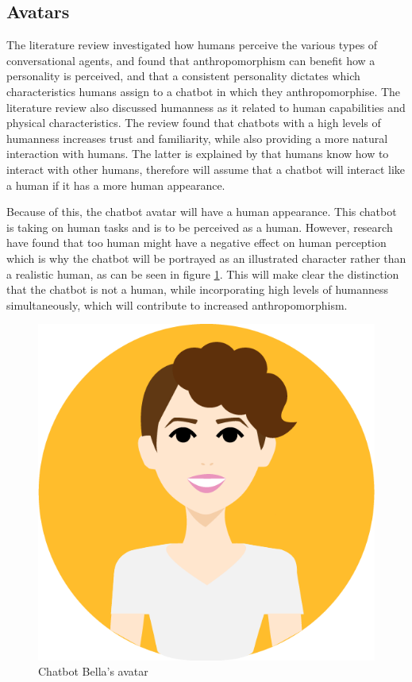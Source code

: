         
\vspace{5mm}

    \subsection{Avatars}
    The literature review investigated how humans perceive the various types of conversational agents, and found that anthropomorphism can benefit how a personality is perceived, and that a consistent personality dictates which characteristics humans assign to a chatbot in which they anthropomorphise. The literature review also discussed humanness as it related to human capabilities and physical characteristics. The review found that chatbots with a high levels of humanness increases trust and familiarity, while also providing a more natural interaction with humans. The latter is explained by that humans know how to interact with other humans, therefore will assume that a chatbot will interact like a human if it has a more human appearance. 
        
    Because of this, the chatbot avatar will have a human appearance. This chatbot is taking on human tasks and is to be perceived as a human. However, research have found that too human might have a negative effect on human perception which is why the chatbot will be portrayed as an illustrated character rather than a realistic human, as can be seen in figure \ref{fig:avatar}. This will make clear the distinction that the chatbot is not a human, while incorporating high levels of humanness simultaneously, which will contribute to increased anthropomorphism.
    
    \begin{figure}[H]
        \centering
        \includegraphics[scale=0.35]{figures/Bella_avatar.png}
        \caption{Chatbot Bella's avatar}
        \label{fig:avatar}
    \end{figure}
    
